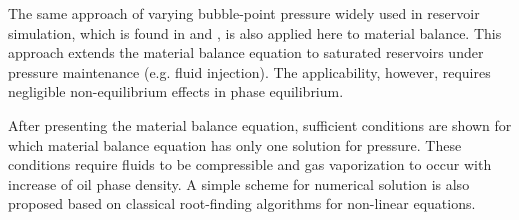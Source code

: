 \documentclass[authoryear,preprint,review,11pt]{elsarticle}
\begin{document}
 The same approach of varying bubble-point pressure widely used in reservoir simulation, which is found in \cite{aziz1979petroleum} and \cite{ertekin2001basic}, is also applied here to material balance. This approach extends the material balance equation to saturated reservoirs under pressure maintenance (e.g. fluid injection). The applicability, however, requires negligible non-equilibrium effects in phase equilibrium.


After presenting the material balance equation, sufficient conditions are shown for which material balance equation has only one solution for pressure. These conditions require fluids to be compressible and gas vaporization to occur with increase of oil phase density. A simple scheme for numerical solution is also proposed based on classical root-finding algorithms for non-linear equations.
\end{document}
